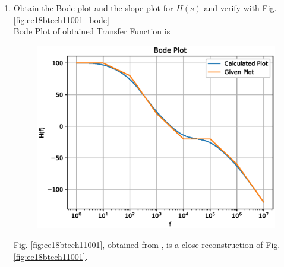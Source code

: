 \begin{enumerate}[label=\thesection.\arabic*.,ref=\thesection.\theenumi]

\item Obtain the Bode plot and the slope plot for $H(s)$ and verify with  Fig. \ref{fig:ee18btech11001_bode}
\\
\solution Bode Plot of obtained Transfer Function is 
\begin{figure}[htp]
    \centering
    \includegraphics[width=\columnwidth]{./figs/ee18btech11001/ee18btech11001_2.eps}
    \caption{}
    \label{fig:ee18btech11001_2}
\end{figure}
%
Fig. \ref{fig:ee18btech11001}, obtained from  \label{eq:ee18btech11001_system},
is a close reconstruction of Fig. \ref{fig:ee18btech11001}.
\end{enumerate}


